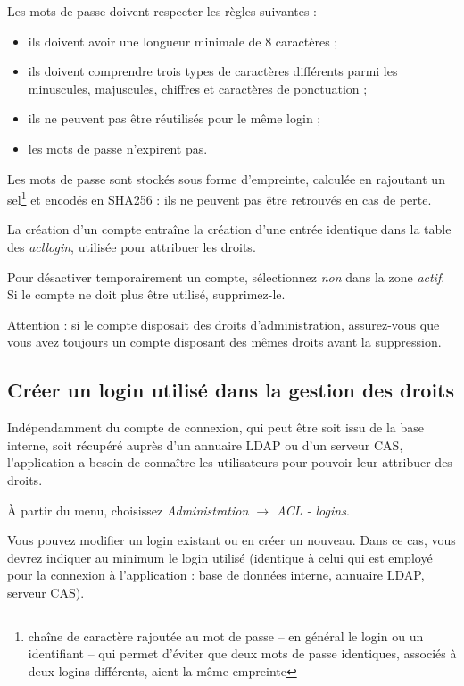 Les mots de passe doivent respecter les règles suivantes :
\begin{itemize}
\item ils doivent avoir une longueur minimale de 8 caractères ;
\item ils doivent comprendre trois types de caractères différents parmi les minuscules, majuscules, chiffres et caractères de ponctuation ;
\item ils ne peuvent pas être réutilisés pour le même login ;
\item les mots de passe n'expirent pas.
\end{itemize}

Les mots de passe sont stockés sous forme d'empreinte, calculée en rajoutant un sel\footnote{chaîne de caractère rajoutée au mot de passe -- en général le login ou un identifiant -- qui permet d'éviter que deux mots de passe identiques, associés à deux logins différents, aient la même empreinte} et encodés en SHA256 : ils ne peuvent pas être retrouvés en cas de perte.

La création d'un compte entraîne la création d'une entrée identique dans la table des \textit{acllogin}, utilisée pour attribuer les droits.

Pour désactiver temporairement un compte, sélectionnez \textit{non} dans la zone \textit{actif}. Si le compte ne doit plus être utilisé, supprimez-le.

Attention : si le compte disposait des droits d'administration, assurez-vous que vous avez toujours un compte disposant des mêmes droits avant la suppression.

\subsection{Créer un login utilisé dans la gestion des droits}

Indépendamment du compte de connexion, qui peut être soit issu de la base interne, soit récupéré auprès d'un annuaire LDAP ou d'un serveur CAS, l'application a besoin de connaître les utilisateurs pour pouvoir leur attribuer des droits.

À partir du menu, choisissez \textit{Administration $\rightarrow$ ACL - logins}.

Vous pouvez modifier un login existant ou en créer un nouveau. Dans ce cas, vous devrez indiquer au minimum le login utilisé (identique à celui qui est employé pour la connexion à l'application : base de données interne, annuaire LDAP, serveur CAS).


